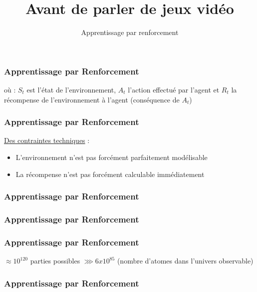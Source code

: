 \documentclass{formation}
\title{Avant de parler de jeux vidéo}
\subtitle{Apprentissage par renforcement}
\begin{document}
\maketitle

\begin{frame}
  \frametitle{Apprentissage par Renforcement}
  où :
  \newline
  $S_t$ est l'état de l'environnement,
  \newline
  $A_t$ l'action effectué par l'agent et
  \newline
  $R_t$ la récompense de l'environnement à l'agent (conséquence de $A_t$)
\end{frame}

\begin{frame}
  \frametitle{Apprentissage par Renforcement}
  \underline{Des contraintes techniques} :
  \begin{itemize}
  \item L'environnement n'est pas forcément parfaitement modélisable
  \item La récompense n'est pas forcément calculable immédiatement
  \end{itemize}
\end{frame}

\begin{frame}
  \frametitle{Apprentissage par Renforcement}
\end{frame}

\begin{frame}
  \frametitle{Apprentissage par Renforcement}
  \begin{center}
  \end{center}
\end{frame}

\begin{frame}
  \frametitle{Apprentissage par Renforcement}
  \begin{center}
  \end{center}
  \begin{center}
    $\approx 10^{120}$ parties possibles $\ggg 6 x 10^{85}$
    \newline
    (nombre d'atomes dans l'univers observable)
  \end{center}
\end{frame}

\begin{frame}
  \frametitle{Apprentissage par Renforcement}
\end{frame}
\end{document}
